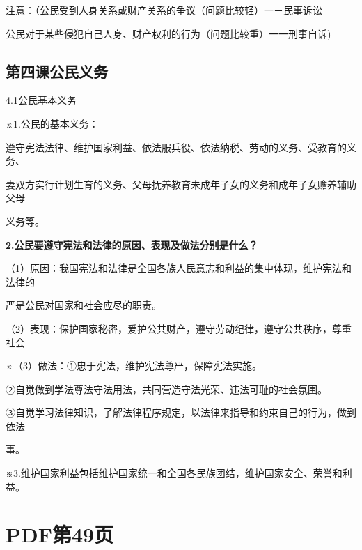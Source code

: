 \documentclass[lang=cn,11pt]{elegantbook}
\newcommand{\daofasym}[1]{{\daofasymbolfont #1}}
\newcommand{\daofasym}[1]{#1}
\begin{document}
注意：（公民受到人身关系或财产关系的争议（问题比较轻）一－民事诉讼\par

公民对于某些侵犯自己人身、财产权利的行为（问题比较重）一一刑事自诉)\par

\subsection*{第四课公民义务}

4.1公民基本义务\par

※1.公民的基本义务：\par

遵守宪法法律、维护国家利益、依法服兵役、依法纳税、劳动的义务、受教育的义务、\par

妻双方实行计划生育的义务、父母抚养教育未成年子女的义务和成年子女赡养辅助父母\par

义务等。\par

\textbf{2.公民要遵守宪法和法律的原因、表现及做法分别是什么？}\par

（1）原因：我国宪法和法律是全国各族人民意志和利益的集中体现，维护宪法和法律的\par

严是公民对国家和社会应尽的职责。\par

（2）表现：保护国家秘密，爱护公共财产，遵守劳动纪律，遵守公共秩序，尊重社会\par

※（3）做法：\daofasym{①}忠于宪法，维护宪法尊严，保障宪法实施。\par

\daofasym{②}自觉做到学法尊法守法用法，共同营造守法光荣、违法可耻的社会氛围。\par

\daofasym{③}自觉学习法律知识，了解法律程序规定，以法律来指导和约束自己的行为，做到依法\par

事。\par

※3.维护国家利益包括维护国家统一和全国各民族团结，维护国家安全、荣誉和利益。\par


\section*{PDF第49页}
\end{document}
